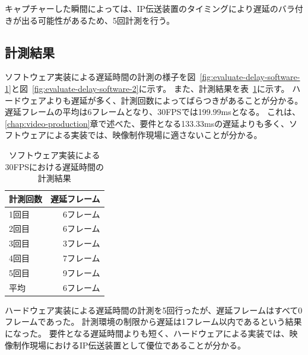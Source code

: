 キャプチャーした瞬間によっては、IP伝送装置のタイミングにより遅延のバラ付きが出る可能性があるため、5回計測を行う。

\subsection{計測結果}


ソフトウェア実装による遅延時間の計測の様子を図~\ref{fig:evaluate-delay-software-1}と図~\ref{fig:evaluate-delay-software-2}に示す。
また、計測結果を表~\ref{tb:evaluate-software-delay}に示す。
ハードウェアよりも遅延が多く、計測回数によってばらつきがあることが分かる。
遅延フレームの平均は6フレームとなり、30FPSでは199.99msとなる。
これは、\ref{chap:video-production}章で述べた、要件となる133.33msの遅延よりも多く、ソフトウェアによる実装では、映像制作現場に適さないことが分かる。

\begin{table}[htbp]
  \caption{ソフトウェア実装による30FPSにおける遅延時間の計測結果}
  \label{tb:evaluate-software-delay}
  \begin{center}
  \begin{tabular}{l|r}
    \hline
     計測回数 & 遅延フレーム \\\hline\hline
     1回目 & 6フレーム   \\\hline
     2回目 & 6フレーム   \\\hline
     3回目 & 3フレーム   \\\hline
     4回目 & 7フレーム   \\\hline
     5回目 & 9フレーム   \\\hline\hline
      平均 & 6フレーム   \\\hline
  \end{tabular}\end{center}
\end{table}

ハードウェア実装による遅延時間の計測を5回行ったが、遅延フレームはすべて0フレームであった。
計測環境の制限から遅延は1フレーム以内であるという結果になった。
要件となる遅延時間よりも短く、ハードウェアによる実装では、映像制作現場におけるIP伝送装置として優位であることが分かる。


